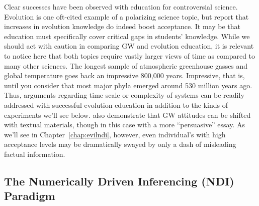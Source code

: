 
Clear successes have been observed with education for controversial science.
Evolution is one oft-cited example of a polarizing science topic, but
\textcite{shtulman_learning_2008} report that increases in evolution knowledge
do indeed boost acceptance. It may be that education must specifically
cover critical gaps in students' knowledge. While we should act with caution in
comparing GW and evolution education, it is relevant to notice here that both
topics require
vastly larger views of time as compared to many other sciences. The longest
sample of atmospheric greenhouse gasses and global temperature goes back an
impressive 800,000 years.  Impressive, that is, until you consider that most
major phyla emerged around 530 million years ago. Thus, arguments regarding time
scale or complexity of systems can be readily addressed with successful
evolution education in addition to the kinds of experiments we'll see below.
\textcite{sinatra_promoting_2012} also demonstrate that GW attitudes can be shifted
with textual materials, though in this case with a more “persuasive” essay. As
we'll see in Chapter~\ref{chap:evilndi}, however, even individual's with high
acceptance levels may be dramatically swayed by only a dash of misleading
factual information. 

\subsection{The Numerically Driven Inferencing (NDI) Paradigm}
\label{sec:ndi}


